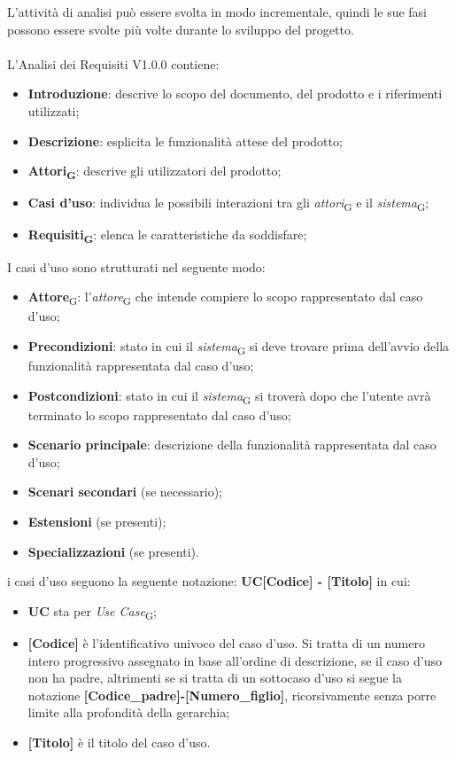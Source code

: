 L'attività di analisi può essere svolta in modo incrementale, quindi le sue fasi possono essere svolte più volte durante lo sviluppo del progetto. 
\\ \\
L'Analisi dei Requisiti V1.0.0 contiene:
\begin{itemize}
    \item \textbf{Introduzione}: descrive lo scopo del documento, del prodotto e i riferimenti utilizzati;
    \item \textbf{Descrizione}: esplicita le funzionalità attese del prodotto;
    \item \textbf{Attori\textsubscript{G}}: descrive gli utilizzatori del prodotto;
    \item \textbf{Casi d'uso}: individua le possibili interazioni tra gli \textit{attori}\textsubscript{G} e il \textit{sistema}\textsubscript{G};
    \item \textbf{Requisiti\textsubscript{G}}: elenca le caratteristiche da soddisfare;
\end{itemize}
I casi d’uso sono strutturati nel seguente modo:
\begin{itemize}
    \item \textbf{Attore}\textsubscript{G}: l’\textit{attore}\textsubscript{G} che intende compiere lo scopo rappresentato dal caso d’uso;
    \item \textbf{Precondizioni}: stato in cui il \textit{sistema}\textsubscript{G} si deve trovare prima dell’avvio della funzionalità rappresentata dal caso d’uso;
    \item \textbf{Postcondizioni}: stato in cui il \textit{sistema}\textsubscript{G} si troverà dopo che l'utente avrà terminato lo scopo rappresentato dal caso d’uso;
    \item \textbf{Scenario principale}: descrizione della funzionalità rappresentata dal caso d’uso;
    \item \textbf{Scenari secondari} (se necessario);
    \item \textbf{Estensioni} (se presenti);
    \item \textbf{Specializzazioni} (se presenti).
\end{itemize}
i casi d'uso seguono la seguente notazione: \textbf{UC[Codice] - [Titolo]} in cui:
\begin{itemize}
    \item \textbf{UC} sta per \textit{Use Case}\textsubscript{G};
    \item \textbf{[Codice]} è l'identificativo univoco del caso d'uso. Si tratta di un numero intero progressivo assegnato in base all'ordine di descrizione, se il caso d'uso non ha padre, altrimenti se si tratta di un sottocaso d'uso si segue la notazione\textbf{ [Codice\_padre]-[Numero\_figlio]}, ricorsivamente senza porre limite alla profondità della gerarchia;
    \item \textbf{[Titolo]} è il titolo del caso d'uso.
\end{itemize}

